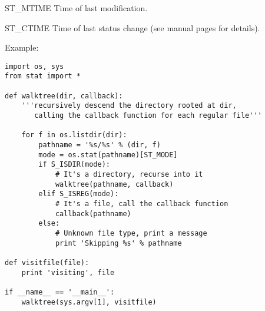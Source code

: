 \begin{datadesc}{ST_MTIME}
Time of last modification.
\end{datadesc}

\begin{datadesc}{ST_CTIME}
Time of last status change (see manual pages for details).
\end{datadesc}

Example:

\begin{verbatim}
import os, sys
from stat import *

def walktree(dir, callback):
    '''recursively descend the directory rooted at dir,
       calling the callback function for each regular file'''

    for f in os.listdir(dir):
        pathname = '%s/%s' % (dir, f)
        mode = os.stat(pathname)[ST_MODE]
        if S_ISDIR(mode):
            # It's a directory, recurse into it
            walktree(pathname, callback)
        elif S_ISREG(mode):
            # It's a file, call the callback function
            callback(pathname)
        else:
            # Unknown file type, print a message
            print 'Skipping %s' % pathname

def visitfile(file):
    print 'visiting', file

if __name__ == '__main__':
    walktree(sys.argv[1], visitfile)
\end{verbatim}
